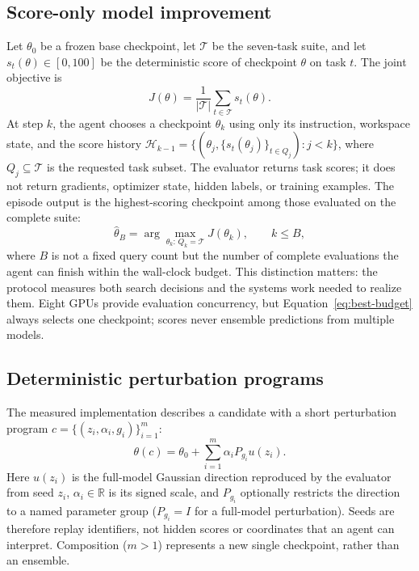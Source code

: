 \documentclass{article}
\newcommand{\score}{J}
\begin{document}
\subsection{Score-only model improvement}

Let $\theta_0$ be a frozen base checkpoint, let $\mathcal{T}$ be the seven-task suite,
and let $s_t(\theta)\in[0,100]$ be the deterministic score of checkpoint $\theta$ on
task $t$. The joint objective is
\begin{equation}
    \score(\theta)=\frac{1}{|\mathcal{T}|}\sum_{t\in\mathcal{T}}s_t(\theta).
    \label{eq:objective}
\end{equation}
At step $k$, the agent chooses a checkpoint $\theta_k$ using only its instruction,
workspace state, and the score history
$\mathcal{H}_{k-1}=\{(\theta_j,\{s_t(\theta_j)\}_{t\in Q_j}):j<k\}$, where
$Q_j\subseteq\mathcal{T}$ is the requested task subset. The evaluator returns task scores;
it does not return gradients, optimizer state, hidden labels, or training examples. The
episode output is the highest-scoring checkpoint among those evaluated on the complete
suite:
\begin{equation}
    \hat\theta_B=\arg\max_{\theta_k:\,Q_k=\mathcal{T}} \score(\theta_k),
    \qquad k\leq B,
    \label{eq:best-budget}
\end{equation}
where $B$ is not a fixed query count but the number of complete evaluations the agent can
finish within the wall-clock budget. This distinction matters: the protocol measures both
search decisions and the systems work needed to realize them. Eight GPUs provide
evaluation concurrency, but Equation~\ref{eq:best-budget} always selects one checkpoint;
scores never ensemble predictions from multiple models.

\subsection{Deterministic perturbation programs}

The measured implementation describes a candidate with a short perturbation program
$c=\{(z_i,\alpha_i,g_i)\}_{i=1}^{m}$:
\begin{equation}
    \theta(c)=\theta_0+\sum_{i=1}^{m}\alpha_i P_{g_i}u(z_i).
    \label{eq:candidate}
\end{equation}
Here $u(z_i)$ is the full-model Gaussian direction reproduced by the evaluator from seed
$z_i$, $\alpha_i\in\mathbb{R}$ is its signed scale, and $P_{g_i}$ optionally restricts the
direction to a named parameter group ($P_{g_i}=I$ for a full-model perturbation). Seeds are
therefore replay identifiers, not hidden scores or coordinates that an agent can interpret.
Composition ($m>1$) represents a new single checkpoint, rather than an ensemble.
\end{document}
